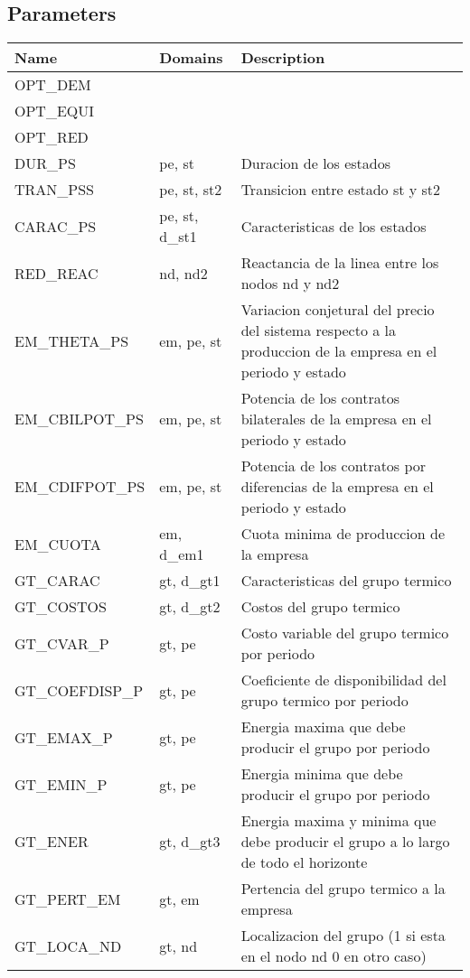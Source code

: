 \documentclass[11pt]{article}
\begin{document}
\subsection*{Parameters}
\begin{tabular}{|l|l|l|} 
\hline 
\textbf{Name} & \textbf{Domains} & \textbf{Description}\\ 
\hline 
 
OPT\_DEM &  &  \\ 
OPT\_EQUI &  &  \\ 
OPT\_RED &  &  \\ 
DUR\_PS & pe, st & Duracion de los estados \\ 
TRAN\_PSS & pe, st, st2 & Transicion entre estado st y st2 \\ 
CARAC\_PS & pe, st, d\_st1 & Caracteristicas de los estados \\ 
RED\_REAC & nd, nd2 & Reactancia de la linea entre los nodos nd y nd2 \\ 
EM\_THETA\_PS & em, pe, st & Variacion conjetural del precio del sistema respecto a la produccion de la empresa en el periodo y estado \\ 
EM\_CBILPOT\_PS & em, pe, st & Potencia de los contratos bilaterales de la empresa en el periodo y estado \\ 
EM\_CDIFPOT\_PS & em, pe, st & Potencia de los contratos por diferencias de la empresa en el periodo y estado \\ 
EM\_CUOTA & em, d\_em1 & Cuota minima de produccion de la empresa \\ 
GT\_CARAC & gt, d\_gt1 & Caracteristicas del grupo termico \\ 
GT\_COSTOS & gt, d\_gt2 & Costos del grupo termico \\ 
GT\_CVAR\_P & gt, pe & Costo variable del grupo termico por periodo \\ 
GT\_COEFDISP\_P & gt, pe & Coeficiente de disponibilidad del grupo termico por periodo \\ 
GT\_EMAX\_P & gt, pe & Energia maxima que debe producir el grupo por periodo \\ 
GT\_EMIN\_P & gt, pe & Energia minima que debe producir el grupo por periodo \\ 
GT\_ENER & gt, d\_gt3 & Energia maxima y minima que debe producir el grupo a lo largo de todo el horizonte \\ 
GT\_PERT\_EM & gt, em & Pertencia del grupo termico a la empresa \\ 
GT\_LOCA\_ND & gt, nd & Localizacion del grupo (1 si esta en el nodo nd 0 en otro caso) \\ 

\end{tabular}
\end{document}
